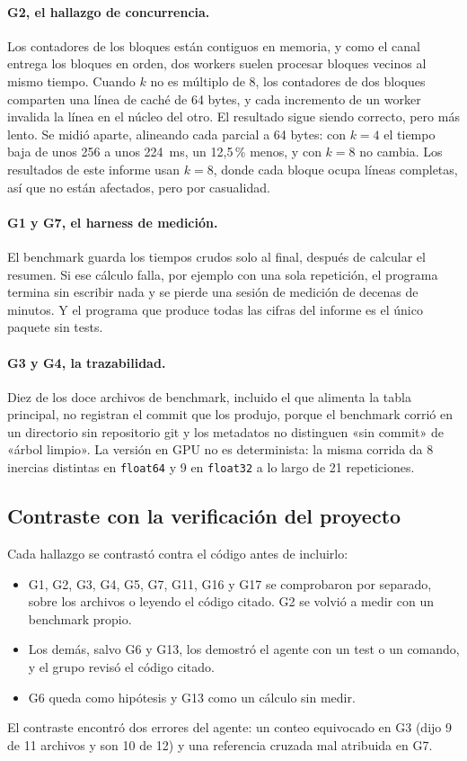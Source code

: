 \paragraph{G2, el hallazgo de concurrencia.} Los contadores de los bloques están contiguos en
memoria, y como el canal entrega los bloques en orden, dos workers suelen procesar bloques vecinos al
mismo tiempo. Cuando $k$ no es múltiplo de 8, los contadores de dos bloques comparten una línea de
caché de 64 bytes, y cada incremento de un worker invalida la línea en el núcleo del otro. El
resultado sigue siendo correcto, pero más lento. Se midió aparte, alineando cada parcial a
64 bytes: con $k=4$ el tiempo baja de unos 256 a unos 224~ms, un 12{,}5\,\% menos, y con $k=8$ no
cambia. Los resultados de este informe usan $k=8$, donde cada bloque ocupa líneas completas, así que
no están afectados, pero por casualidad.

\paragraph{G1 y G7, el harness de medición.} El benchmark guarda los tiempos crudos solo al final,
después de calcular el resumen. Si ese cálculo falla, por ejemplo con una sola repetición, el
programa termina sin escribir nada y se pierde una sesión de medición de decenas de minutos. Y el
programa que produce todas las cifras del informe es el único paquete sin tests.

\paragraph{G3 y G4, la trazabilidad.} Diez de los doce archivos de benchmark, incluido el que
alimenta la tabla principal, no registran el commit que los produjo, porque el benchmark corrió en
un directorio sin repositorio git y los metadatos no distinguen «sin commit» de «árbol limpio». La versión en GPU no es
determinista: la misma corrida da 8 inercias distintas en \texttt{float64} y 9 en \texttt{float32} a
lo largo de 21 repeticiones.

\subsection{Contraste con la verificación del proyecto}

Cada hallazgo se contrastó contra el código antes de incluirlo:
\begin{itemize}
  \item G1, G2, G3, G4, G5, G7, G11, G16 y G17 se comprobaron por separado, sobre los archivos o
        leyendo el código citado. G2 se volvió a medir con un benchmark propio.
  \item Los demás, salvo G6 y G13, los demostró el agente con un test o un comando, y el grupo revisó
        el código citado.
  \item G6 queda como hipótesis y G13 como un cálculo sin medir.
\end{itemize}
El contraste encontró dos errores del agente: un conteo equivocado en G3 (dijo 9 de 11 archivos y
son 10 de 12) y una referencia cruzada mal atribuida en G7.

